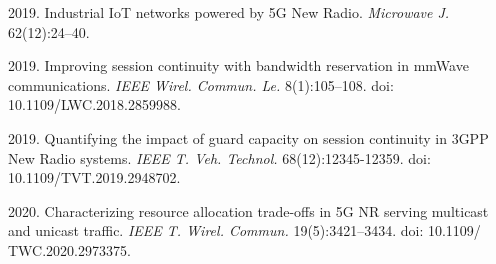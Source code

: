   \begin{multicols}{2}

\renewcommand{\bibname}{\protect\rmfamily References}



{\small\frenchspacing
 {%
 \begin{thebibliography}{99} 
 2019. Industrial IoT networks powered by 
5G New Radio. \textit{Microwave J.} 62(12):24--40.

 2019. Improving session continuity with bandwidth 
reservation in mmWave communications. \textit{IEEE Wirel. Commun. Le.} 8(1):105--108. doi: 10.1109/LWC.2018.2859988.

 2019. Quantifying the impact of guard capacity on session 
continuity in 3GPP New Radio systems. \textit{IEEE T. Veh. Technol.} 
68(12):12345-12359. doi: 10.1109/TVT.2019.2948702.

2020. Characterizing resource 
allocation trade-offs in 5G NR serving multicast and unicast traffic. 
\textit{IEEE T. Wirel. Commun.} 19(5):3421--3434. doi: 10.1109/ TWC.2020.2973375.



\end{thebibliography}}}
\end{multicols}
